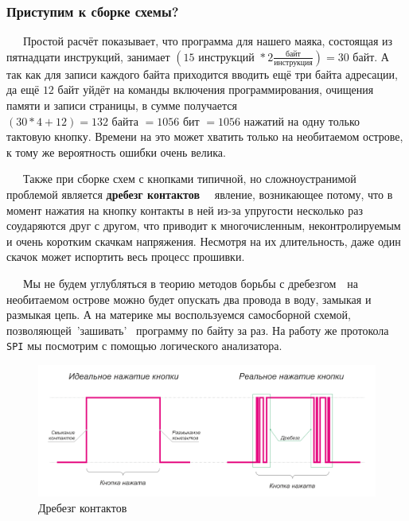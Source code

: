 \documentclass[aspectratio=169, pdf, 8pt, unicode]{beamer}
\begin{document}
\begin{frame}[fragile]
\frametitle{Приступим к сборке схемы?}
	\ \ \ Простой расчёт показывает, что программа для нашего маяка, состоящая из пятнадцати инструкций, занимает
	$(15 \text{ инструкций } * 2 \frac{\text{байт}}{\text{инструкция}}) = 30$ байт. А так как для записи каждого байта
	приходится вводить ещё три байта адресации, да ещё $12$ байт уйдёт на команды включения программирования,
	очищения памяти и записи страницы, в сумме получается $(30 * 4 + 12) = 132 \text{ байта } = 1056 \text{ бит } = 1056$
	нажатий на одну только тактовую кнопку. Времени на это может хватить только на необитаемом острове, к тому же
	вероятность ошибки очень велика.

	\ \ \ Также при сборке схем с кнопками типичной, но сложноустранимой проблемой является \textbf{дребезг контактов}
	\ \cyrdash\ явление, возникающее потому, что в момент нажатия на кнопку контакты в ней из-за упругости
	несколько раз соударяются друг с другом, что приводит к многочисленным, неконтролируемым и очень коротким скачкам
	напряжения. Несмотря на их длительность, даже один скачок может испортить весь процесс прошивки.

	\ \ \ Мы не будем углубляться в теорию методов борьбы с дребезгом\ \cyrdash\ на необитаемом острове можно будет опускать два
	провода в воду, замыкая и размыкая цепь. А на материке мы воспользуемся самосборной схемой, позволяющей\ 'зашивать'
	\ программу по байту за раз. На работу же протокола \texttt{SPI} мы посмотрим с помощью логического анализатора.
	\begin{figure}[H]
		\vspace*{-0.5cm}
		\centering
		\includegraphics[width=0.4\linewidth]{resources/bounce_rus.png}
		\caption{Дребезг контактов}
	\end{figure}
\end{frame}
\end{document}

